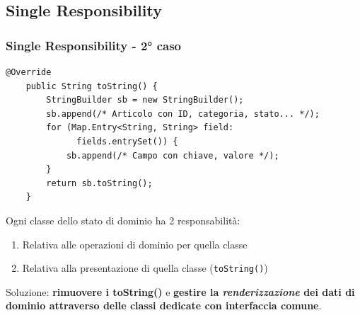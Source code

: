 \subsection{Single Responsibility}

\begin{frame}[fragile]
    \frametitle{Single Responsibility - 2° caso}
    \begin{lstlisting}[autogobble, title={\texttt{toString()} di \texttt{Article.java}}]
    @Override
    public String toString() {
        StringBuilder sb = new StringBuilder();
        sb.append(/* Articolo con ID, categoria, stato... */);
        for (Map.Entry<String, String> field:
              fields.entrySet()) {
            sb.append(/* Campo con chiave, valore */);
        }
        return sb.toString();
    }
    \end{lstlisting}

    Ogni classe dello stato di dominio ha 2 responsabilità:
    \begin{enumerate}
        \item Relativa alle operazioni di dominio per quella classe
        \item Relativa alla presentazione di quella classe (\texttt{toString()})
    \end{enumerate}

    Soluzione: \textbf{rimuovere i toString()} e \textbf{gestire la \emph{renderizzazione} dei dati di dominio
    attraverso delle classi dedicate con interfaccia comune}.
\end{frame}

